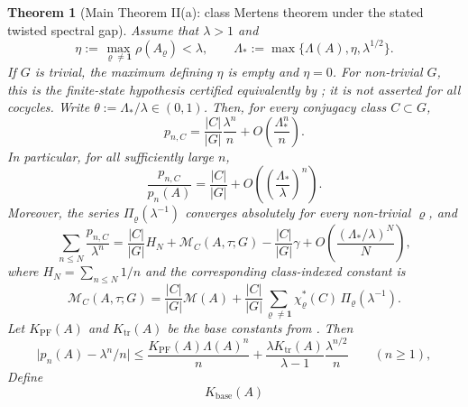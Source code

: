 \documentclass[11pt,a4paper]{amsart}
\theoremstyle{plain}
\newtheorem{theorem}{Theorem}[section]
\theoremstyle{definition}
\theoremstyle{remark}
\newcommand{\abs}[1]{\lvert #1 \rvert}
\begin{document}
\begin{theorem}[Main Theorem II(a): class Mertens theorem under the
  stated twisted spectral gap]
  \label{thm:class-mertens-explicit}
  Assume that \(\lambda>1\) and
  \[
    \eta:=\max_{\varrho\neq\mathbf 1}\rho(A_\varrho)<\lambda,
    \qquad
    \Lambda_*:=\max\{\Lambda(A),\eta,\lambda^{1/2}\}.
  \]
  If \(G\) is trivial, the maximum defining \(\eta\) is empty and
  \(\eta=0\). For non-trivial \(G\), this is the finite-state hypothesis
  certified equivalently by
  ; it is not asserted for
  all cocycles.
  Write \(\theta:=\Lambda_*/\lambda\in(0,1)\).
  Then, for every conjugacy class \(C\subset G\),
  \begin{equation}\label{eq:class-primitive-asymptotic}
    p_{n,C}
    =
    \frac{|C|}{|G|}\frac{\lambda^n}{n}
    +O\!\left(\frac{\Lambda_*^n}{n}\right).
  \end{equation}
  In particular, for all sufficiently large \(n\),
  \begin{equation}\label{eq:class-chebotarev-density}
    \frac{p_{n,C}}{p_n(A)}
    =
    \frac{|C|}{|G|}
    +O\!\left(\left(\frac{\Lambda_*}{\lambda}\right)^n\right).
  \end{equation}
  Moreover, the series \(\Pi_\varrho(\lambda^{-1})\) converges
  absolutely for every non-trivial \(\varrho\), and
  \begin{equation}\label{eq:class-mertens-harmonic}
    \sum_{n\le N}\frac{p_{n,C}}{\lambda^n}
    =
    \frac{|C|}{|G|}H_N
    +\mathcal M_C(A,\tau;G)-\frac{|C|}{|G|}\gamma
    +O\!\left(\frac{(\Lambda_*/\lambda)^N}{N}\right),
  \end{equation}
  where \(H_N=\sum_{n\le N}1/n\) and the corresponding class-indexed
  constant is
  \begin{equation}\label{eq:class-mertens-constant}
    \mathcal M_C(A,\tau;G)
    =
    \frac{|C|}{|G|}\mathcal M(A)
    +\frac{|C|}{|G|}
      \sum_{\varrho\neq\mathbf 1}
        \chi_\varrho^\ast(C)\,\Pi_\varrho(\lambda^{-1}).
  \end{equation}
  Let \(K_{\mathrm{PF}}(A)\) and \(K_{\mathrm{tr}}(A)\) be the base
  constants from . Then
  \begin{equation}\label{eq:class-mertens-base-constant}
    \abs{p_n(A)-\lambda^n/n}
    \le
    \frac{K_{\mathrm{PF}}(A)\Lambda(A)^n}{n}
    +\frac{\lambda K_{\mathrm{tr}}(A)}{\lambda-1}
      \frac{\lambda^{n/2}}{n}
    \qquad (n\ge 1),
  \end{equation}
  Define
  \[
    K_{\mathrm{base}}(A)
\]
\end{theorem}
\end{document}
